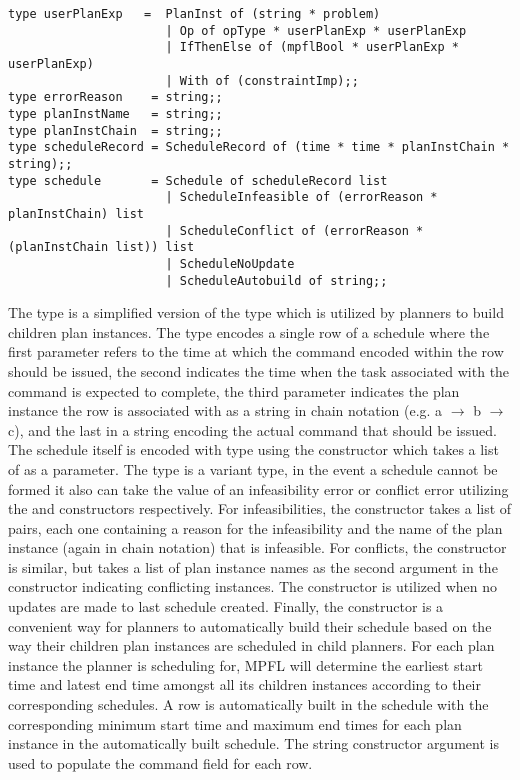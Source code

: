 \begin{verbatim}
type userPlanExp   =  PlanInst of (string * problem) 
                      | Op of opType * userPlanExp * userPlanExp 
                      | IfThenElse of (mpflBool * userPlanExp * userPlanExp)
                      | With of (constraintImp);;
type errorReason    = string;;
type planInstName   = string;;
type planInstChain  = string;;
type scheduleRecord = ScheduleRecord of (time * time * planInstChain * string);;
type schedule       = Schedule of scheduleRecord list 
                      | ScheduleInfeasible of (errorReason * planInstChain) list 
                      | ScheduleConflict of (errorReason * (planInstChain list)) list 
                      | ScheduleNoUpdate
                      | ScheduleAutobuild of string;; 
\end{verbatim}

The type  is a simplified version of the type  which is utilized by planners to build children plan instances. The type  encodes a single row of a schedule where the first parameter refers to the time at which the command encoded within the row should be issued, the second indicates the time when the task associated with the command is expected to complete, the third parameter indicates the plan instance the row is associated with as a string in chain notation (e.g. a $\rightarrow$ b $\rightarrow$ c), and the last in a string encoding the actual command that should be issued. The schedule itself is encoded with type  using the constructor  which takes a list of  as a parameter. The  type is a variant type, in the event a schedule cannot be formed it also can take the value of an infeasibility error or conflict error utilizing the  and  constructors respectively. For infeasibilities, the constructor takes a list of pairs, each one containing a reason for the infeasibility and the name of the plan instance (again in chain notation) that is infeasible. For conflicts, the constructor is similar, but takes a list of plan instance names as the second argument in the constructor indicating conflicting instances. The constructor  is utilized when no updates are made to last schedule created. Finally, the  constructor is a convenient way for planners to automatically build their schedule based on the way their children plan instances are scheduled in child planners. For each plan instance the planner is scheduling for, MPFL will determine the earliest start time and latest end time amongst all its children instances according to their corresponding schedules. A row is automatically built in the schedule with the corresponding minimum start time and maximum end times for each plan instance in the automatically built schedule. The string constructor argument is used to populate the command field for each row.

